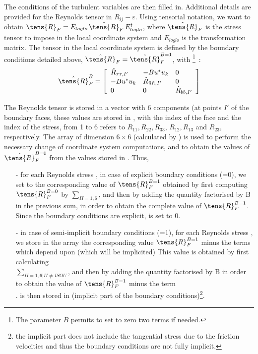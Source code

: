The conditions of the turbulent variables are then filled in. 
Additional details are provided for the Reynolds tensor 
in  $R_{ij}-\varepsilon$.
Using tensorial notation, we want to obtain 
$\tens{R}_F = E_{loglo}\,\hat{\tens{R}}_F\,E^t_{loglo}$, where 
$\hat{\tens{R}}_F$ is the stress tensor to impose in the local 
coordinate system and $E_{loglo}$ is the transformation matrix.
The tensor in the local coordinate system is defined by the boundary 
conditions detailed above,  $\hat{\tens{R}}_F=\hat{\tens{R}}^{B=1}_F$, 
with \footnote{The parameter 
$B$ permits to set to zero two terms if needed.}~:
\begin{equation}
\hat{\tens{R}}^B_{F}=\left[\begin{array}{lll}
\hat{R}_{\tau\tau,I'}&-Bu^*u_k                       &0\\
-Bu^*u_k             &\hat{R}_{\tilde{n}\tilde{n},I'}&0\\
0                    &0                              &\hat{R}_{bb,I'}
\end{array}\right]
\end{equation}

The Reynolds tensor is stored in a vector with 6 components (at points $I'$ 
of the boundary faces, these values are stored in , 
with  the index of the face and  the index of the stress, 
from 1 to 6  refers to $R_{11},R_{22}, R_{33}$, 
$R_{12}, R_{13}$ and $R_{23}$, respectively. The array  of 
dimension $6\times 6$ (calculated by ) is used to perform 
the necessary change of coordinate system computations, and to obtain 
the values of $\hat{\tens{R}}^{B=0}_F$ from the values stored in 
.
Thus,
\begin{itemize}
\item[-] for each Reynolds stress ,
in case of explicit boundary conditions (=0), we set 
  to the corresponding value of 
$\tens{R}^{B=1}_F$ obtained by first computing 
$\tens{R}^{B=0}_F$ by 
$\sum_{II=1,6}$, and then by adding 
the quantity factorised by B in the previous sum, in order to obtain 
the complete value of $\tens{R}^{B=1}_F$. Since the boundary conditions
are explicit,   is set to  0.
\item[-] in case of semi-implicit boundary conditions (=1),
for each Reynolds stress ,
we store in the array  the corresponding value 
$\tens{R}^{B=1}_F$  minus the terms which depend upon 
 (which will be implicited)
This value is obtained by first calculating \\
$\sum_{II=1,6|II\neq ISOU}$,
and then by adding the quantity  factorised by B in order to obtain
the value of $\tens{R}^{B=1}_F$ minus the term \\
.  
 is then stored in  (implicit part of
the boundary conditions)\footnote{the implicit part does not include 
the tangential stress due to the friction velocities and thus the boundary 
conditions are not fully implicit.}. 
\end{itemize}

